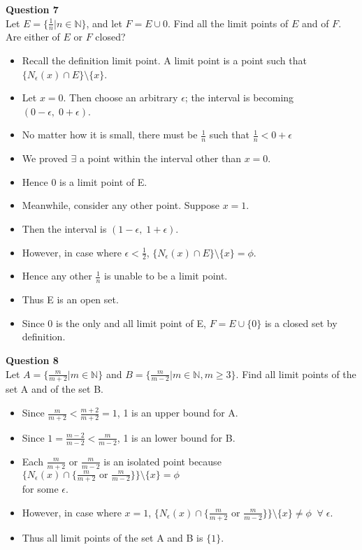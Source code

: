 \documentclass[12pt]{article}
\begin{document}
\newpage
\textbf{Question 7}\\
Let $E = \{\frac{1}{n}|n\in \mathbb{N}\}$, and let $F = E \cup {0}$. Find all the limit points of $E$ and of $F$. Are either of $E$ or $F$ closed?
\begin{itemize}
    \item Recall the definition limit point. A limit point is a point such that $\{N_\epsilon(x) \cap E\} \setminus \{x\}$.
    \item Let $x = 0$. Then choose an arbitrary $\epsilon$; the interval is becoming $(0-\epsilon,\; 0+\epsilon)$. 
    \item No matter how it is small, there must be $\frac{1}{n} $ such that $\frac{1}{n} < 0+\epsilon$
    \item We proved $\exists$ a point within the interval other than $x=0$.
    \item Hence 0 is a limit point of E.\\
    
    \item Meanwhile, consider any other point. Suppose $x = 1$.
    \item Then the interval is $(1-\epsilon,\;1+\epsilon)$.
    \item However, in case where $\epsilon <\frac{1}{2}$, $\{N_\epsilon(x) \cap E\} \setminus \{x\} = \phi$.
    \item Hence any other $\frac{1}{n}$ is unable to be a limit point.
    \item Thus E is an open set.\\
    
    \item Since 0 is the only and all limit point of E, $F = E \cup \{0\}$ is a closed set by definition.
\end{itemize}


\newpage
\textbf{Question 8}\\
Let $A = \{\frac{m}{m+2}|m\in\mathbb{N}\}$ and $B= \{\frac{m}{m-2}|m\in\mathbb{N}, m\ge 3\}$. Find all limit points of the set A and of the set B.
\begin{itemize}
    \item Since $\frac{m}{m+2} < \frac{m+2}{m+2} = 1$, 1 is an upper bound for A.
    \item Since $1 = \frac{m-2}{m-2} < \frac{m}{m-2}$, 1 is an lower bound for B.\\
    
    \item Each $\frac{m}{m+2} $ or $\frac{m}{m-2}$ is an isolated point because $\{N_\epsilon(x) \cap \{\frac{m}{m+2} \text{ or }\frac{m}{m-2}\} \} \setminus \{x\} = \phi$\\ for some $\epsilon$.
    \item However, in case where $x = 1$, $\{N_\epsilon(x) \cap \{\frac{m}{m+2} \text{ or }\frac{m}{m-2}\} \} \setminus \{x\} \neq \phi\;\;\forall\;\epsilon$.
    \item Thus all limit points of the set A and B is $\{1\}$.
\end{itemize}
\end{document}
